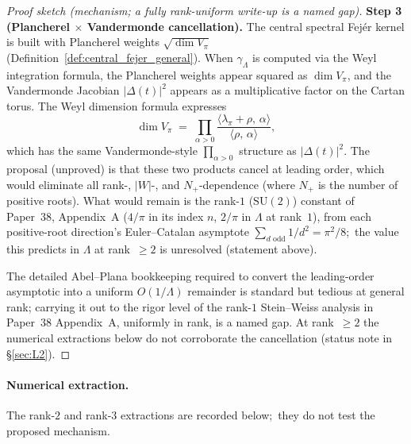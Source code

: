 \documentclass[11pt,a4paper]{article}
\theoremstyle{plain}
\theoremstyle{definition}
\newcommand{\Lammax}{\Lambda}
\newcommand{\SU}{\mathrm{SU}}
\begin{document}
\begin{proof}[Proof sketch (mechanism; a fully rank-uniform
write-up is a named gap)]
\textbf{Step 3 (Plancherel $\times$ Vandermonde cancellation).} The
central spectral Fej\'er kernel is built with Plancherel weights
$\sqrt{\dim V_\pi}$ (Definition~\ref{def:central_fejer_general}). When
$\gamma_\Lammax$ is computed via the Weyl integration formula, the
Plancherel weights appear squared as $\dim V_\pi$, and the
Vandermonde Jacobian $|\Delta(t)|^2$ appears as a multiplicative
factor on the Cartan torus. The Weyl dimension formula expresses
\begin{equation*}
   \dim V_\pi
   \;=\; \prod_{\alpha > 0}
   \frac{\langle \lambda_\pi + \rho,\, \alpha\rangle}
        {\langle\rho,\, \alpha\rangle},
\end{equation*}
which has the same Vandermonde-style $\prod_{\alpha > 0}$ structure
as $|\Delta(t)|^2$. The proposal (unproved) is that these two
products cancel at leading order, which would eliminate all
rank-, $|W|$-, and $N_+$-dependence (where $N_+$ is the number of
positive roots). What would remain is the rank-$1$ ($\SU(2)$) constant of
Paper~38, Appendix~A ($4/\pi$ in its index $n$, $2/\pi$ in $\Lammax$ at
rank~$1$), from each positive-root direction's
Euler--Catalan asymptote $\sum_{d \text{ odd}} 1/d^2 = \pi^2/8$;\ the
value this predicts in $\Lammax$ at rank~$\ge 2$ is unresolved
(statement above).

The detailed Abel--Plana bookkeeping required to convert the
leading-order asymptotic into a uniform $O(1/\Lammax)$ remainder is
standard but tedious at general rank; carrying it out to the rigor
level of the rank-$1$ Stein--Weiss analysis in Paper~38 Appendix~A,
uniformly in rank, is a named gap. At rank~$\ge 2$ the numerical
extractions below do not corroborate the cancellation (status note in
\S\ref{sec:L2}).
\end{proof}

\paragraph{Numerical extraction.} The rank-$2$ and rank-$3$ extractions
are recorded below;\ they do not test the proposed mechanism.
\end{document}
